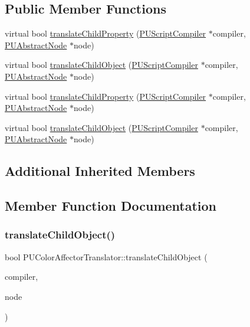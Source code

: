 \subsection*{Public Member Functions}
\begin{DoxyCompactItemize}
\item 
virtual bool \hyperlink{classPUColorAffectorTranslator_a80eaf9a76c5563fa19d55d1e09a5d1da}{translate\+Child\+Property} (\hyperlink{classPUScriptCompiler}{P\+U\+Script\+Compiler} $\ast$compiler, \hyperlink{classPUAbstractNode}{P\+U\+Abstract\+Node} $\ast$node)
\item 
virtual bool \hyperlink{classPUColorAffectorTranslator_ad3f85b2465384b9e586d7882dc6f06d4}{translate\+Child\+Object} (\hyperlink{classPUScriptCompiler}{P\+U\+Script\+Compiler} $\ast$compiler, \hyperlink{classPUAbstractNode}{P\+U\+Abstract\+Node} $\ast$node)
\item 
virtual bool \hyperlink{classPUColorAffectorTranslator_a0f505147815619f2b7be9065b4a959db}{translate\+Child\+Property} (\hyperlink{classPUScriptCompiler}{P\+U\+Script\+Compiler} $\ast$compiler, \hyperlink{classPUAbstractNode}{P\+U\+Abstract\+Node} $\ast$node)
\item 
virtual bool \hyperlink{classPUColorAffectorTranslator_a667ea1e6f4626786be341cb0313ed8a2}{translate\+Child\+Object} (\hyperlink{classPUScriptCompiler}{P\+U\+Script\+Compiler} $\ast$compiler, \hyperlink{classPUAbstractNode}{P\+U\+Abstract\+Node} $\ast$node)
\end{DoxyCompactItemize}
\subsection*{Additional Inherited Members}


\subsection{Member Function Documentation}
\mbox{\label{classPUColorAffectorTranslator_ad3f85b2465384b9e586d7882dc6f06d4}} 
\subsubsection{\texorpdfstring{translate\+Child\+Object()}{translateChildObject()}\hspace{0.1cm}{\footnotesize\ttfamily [1/2]}}
{\footnotesize\ttfamily bool P\+U\+Color\+Affector\+Translator\+::translate\+Child\+Object (\begin{DoxyParamCaption}\item[{\hyperlink{classPUScriptCompiler}{P\+U\+Script\+Compiler} $\ast$}]{compiler,  }\item[{\hyperlink{classPUAbstractNode}{P\+U\+Abstract\+Node} $\ast$}]{node }\end{DoxyParamCaption})\hspace{0.3cm}{\ttfamily [virtual]}}

